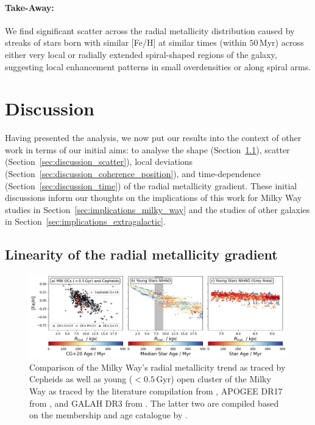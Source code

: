 \documentclass[twocolumn,apj,numberedappendix,appendixfloats,twocolappendix]{openjournal}
\newcommand{\nihaoAGEmax}{$0.5\,\mathrm{Gyr}$}
\begin{document}
\begin{CJK*}{UTF8}{gbsn}
\paragraph*{Take-Away:} We find significant scatter across the radial metallicity distribution caused by streaks of stars born with similar [Fe/H] at similar times (within $50\,\mathrm{Myr}$) across either very local or radially extended spiral-shaped regions of the galaxy, suggesting local enhancement patterns in small overdensities or along spiral arms.

\section{Discussion} \label{sec:discussion}

Having presented the analysis, we now put our results into the context of other work in terms of our initial aims: to analyse the shape (Section~\ref{sec:discussion_linearity}), scatter (Section~\ref{sec:discussion_scatter}), local deviations (Section~\ref{sec:discussion_coherence_position}), and time-dependence (Section~\ref{sec:discussion_time}) of the radial metallicity gradient. These initial discussions inform our thoughts on the implications of this work for Milky Way studies in Section~\ref{sec:implications_milky_way} and the studies of other galaxies in Section~\ref{sec:implications_extragalactic}.

\subsection{Linearity of the radial metallicity gradient} \label{sec:discussion_linearity}

\begin{figure}
    \centering
    \includegraphics[width=\textwidth]{figures/radial_metallicity_gradients_mw_vs_nihao.png}
    \caption{Comparison of the Milky Way's radial metallicity trend as traced by Cepheids \citep[black triangles, compiled from literature by][G+14]{Genovali2014} as well as young ($<$\nihaoAGEmax) open cluster of the Milky Way as traced by the literature compilation from \citet[][G+14 as squares]{Genovali2014}, APOGEE DR17 from \citet[][M+22 as crosses]{Myers2022}, and GALAH DR3 from \citet[][S+21 as circles]{Spina2021}. The latter two are compiled based on the membership and age catalogue by \citet[][CG+20]{CantatGaudin2020}.
    }
    \label{fig:radial_metallicity_gradients_mw_vs_nihao}
\end{figure}


\end{CJK*}
\end{document}
